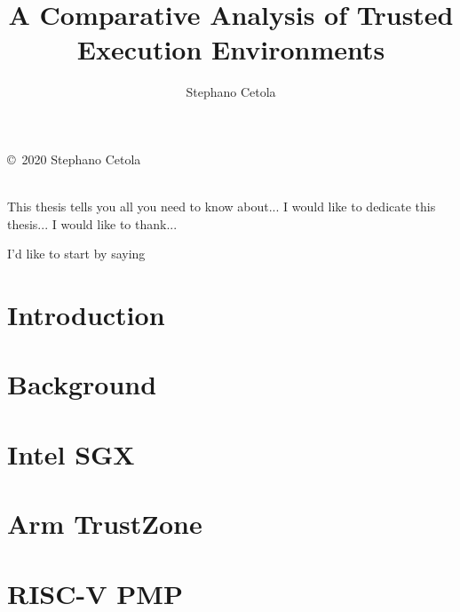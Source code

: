 \documentclass[12pt,oneside,letterpaper,hidelinks]{PSUreport}
\begin{document}
\title{A Comparative Analysis of Trusted Execution Environments}
\subtitle{}
\author{Stephano Cetola}
\submitdate{\today}

\copyrightfalse
\figurespagetrue
\tablespagetrue
\beforepreface
\null\vfill
\begin{center}
        \copyright\ 2020 Stephano Cetola \\
        \doclicenseLongText \\
        \vspace{5 mm}
        \doclicenseImage
\end{center}
\vfill\newpage

This thesis tells you all you need to know about...
I would like to dedicate this thesis...
I would like to thank...
\afterpreface

\printglossary[type=\acronymtype]
\printglossary

I'd like to start by saying




\glsresetall
\chapter{Introduction}
\label{chap:intro}


\glsresetall
\chapter{Background}
\label{chap:bg}


\glsresetall
\chapter{Intel SGX}
\label{chap:sgx}


\glsresetall
\chapter{Arm TrustZone}
\label{chap:trustzone}


\glsresetall
\chapter{RISC-V PMP}
\label{chap:pmp}

\end{document}
